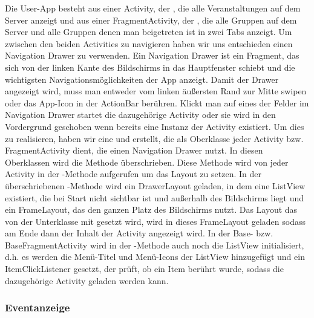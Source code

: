 Die User-App besteht aus einer Activity, der , die alle Veranstaltungen auf dem Server anzeigt und aus einer FragmentActivity, der , die alle Gruppen auf dem Server und alle Gruppen denen man beigetreten ist in zwei Tabs anzeigt. Um zwischen den beiden Activities zu navigieren haben wir uns entschieden einen Navigation Drawer zu verwenden. Ein Navigation Drawer ist ein Fragment, das sich von der linken Kante des Bildschirms in das Hauptfenster schiebt und die wichtigsten Navigationsmöglichkeiten der App anzeigt. Damit der Drawer angezeigt wird, muss man entweder vom linken äußersten Rand zur Mitte swipen oder das App-Icon in der ActionBar berühren. Klickt man auf eines der Felder im Navigation Drawer startet die dazugehörige Activity oder sie wird in den Vordergrund geschoben wenn bereits eine Instanz der Activity existiert. Um dies zu realisieren, haben wir eine  und  erstellt, die als Oberklasse jeder Activity bzw. FragmentActivity dient, die einen Navigation Drawer nutzt. In diesen Oberklassen wird die  Methode überschrieben. Diese Methode wird von jeder Activity in der -Methode aufgerufen um das Layout zu setzen. In der überschriebenen -Methode wird ein DrawerLayout geladen, in dem eine ListView existiert, die bei Start nicht sichtbar ist und außerhalb des Bildschirms liegt und ein FrameLayout, das den ganzen Platz des Bildschirms nutzt. Das Layout das von der Unterklasse mit  gesetzt wird, wird in dieses FrameLayout geladen sodass am Ende dann der Inhalt der Activity angezeigt wird. In der Base- bzw. BaseFragmentActivity wird in der -Methode auch noch die ListView initialisiert, d.h. es werden die Menü-Titel und Menü-Icons der ListView hinzugefügt und ein ItemClickListener gesetzt, der prüft, ob ein Item berührt wurde, sodass die dazugehörige Activity geladen werden kann.
\FloatBarrier

\subsubsection{Eventanzeige}

